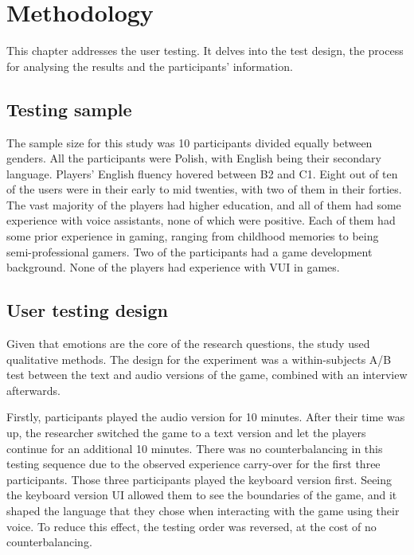 \chapter{Methodology}
\label{ch:method}


This chapter addresses the user testing. It delves into the test design, the process for analysing the results and the participants' information. 

\section{Testing sample}

The sample size for this study was 10 participants divided equally between genders. 
All the participants were Polish, with English being their secondary language. Players' English fluency hovered between B2 and C1.
Eight out of ten of the users were in their early to mid twenties, with two of them in their forties.
The vast majority of the players had higher education, and all of them had some experience with voice assistants, none of which were positive.
Each of them had some prior experience in gaming, ranging from childhood memories to being semi-professional gamers. Two of the participants had a game development background. None of the players had experience with VUI in games.


\section{User testing design}

Given that emotions are the core of the research questions, the study used qualitative methods.
The design for the experiment was a within-subjects A/B test between the text and audio versions of the game, combined with an interview afterwards.

Firstly, participants played the audio version for 10 minutes. After their time was up, the researcher switched the game to a text version and let the players continue for an additional 10 minutes.
There was no counterbalancing in this testing sequence due to the observed experience carry-over for the first three participants.
Those three participants played the keyboard version first. 
Seeing the keyboard version UI allowed them to see the boundaries of the game, and it shaped the language that they chose when interacting with the game using their voice.
To reduce this effect, the testing order was reversed, at the cost of no counterbalancing.

